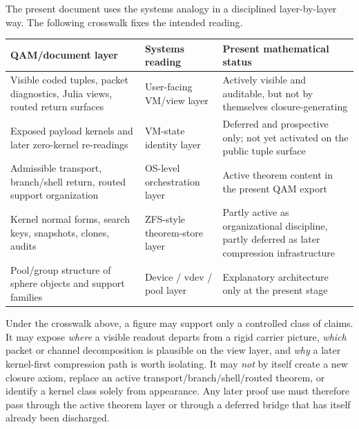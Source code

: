 \begin{remark}\label{rem:qam-vm-os-crosswalk}
The present document uses the systems analogy in a disciplined layer-by-layer way. The following crosswalk fixes the intended reading.
\begin{center}
\renewcommand{\arraystretch}{1.12}
\begin{tabular}{|p{}|p{}|p{}|}
\hline
\textbf{QAM/document layer} & \textbf{Systems reading} & \textbf{Present mathematical status} \\
\hline
Visible coded tuples, packet diagnostics, Julia views, routed return surfaces & User-facing VM/view layer & Actively visible and auditable, but not by themselves closure-generating \\
\hline
Exposed payload kernels and later zero-kernel re-readings & VM-state identity layer & Deferred and prospective only; not yet activated on the public tuple surface \\
\hline
Admissible transport, branch/shell return, routed support organization & OS-level orchestration layer & Active theorem content in the present QAM export \\
\hline
Kernel normal forms, search keys, snapshots, clones, audits & ZFS-style theorem-store layer & Partly active as organizational discipline, partly deferred as later compression infrastructure \\
\hline
Pool/group structure of sphere objects and support families & Device / vdev / pool layer & Explanatory architecture only at the present stage \\
\hline
\end{tabular}
\end{center}
\end{remark}

\begin{remark}\label{rem:qam-vm-os-visual-discipline}
Under the crosswalk above, a figure may support only a controlled class of claims. It may expose \emph{where} a visible readout departs from a rigid carrier picture, \emph{which} packet or channel decomposition is plausible on the view layer, and \emph{why} a later kernel-first compression path is worth isolating. It may \emph{not} by itself create a new closure axiom, replace an active transport/branch/shell/routed theorem, or identify a kernel class solely from appearance. Any later proof use must therefore pass through the active theorem layer or through a deferred bridge that has itself already been discharged.
\end{remark}


